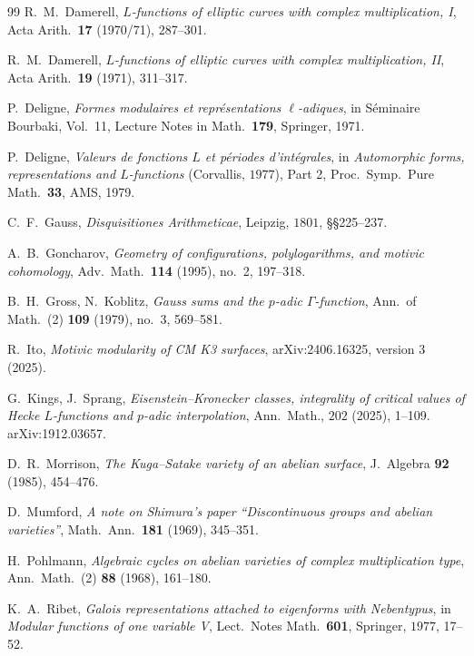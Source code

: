 \documentclass[11pt,a4paper]{amsart}
\theoremstyle{plain}
\theoremstyle{definition}
\begin{document}
\begin{thebibliography}{99}
R.\ M.\ Damerell,
\emph{$L$-functions of elliptic curves with complex multiplication, I},
Acta Arith.\ \textbf{17} (1970/71), 287--301.

R.\ M.\ Damerell,
\emph{$L$-functions of elliptic curves with complex multiplication, II},
Acta Arith.\ \textbf{19} (1971), 311--317.

P.\ Deligne,
\emph{Formes modulaires et repr\'esentations $\ell$-adiques}, in
S\'eminaire Bourbaki, Vol.\ 11, Lecture Notes in Math.\ \textbf{179},
Springer, 1971.

P.\ Deligne,
\emph{Valeurs de fonctions $L$ et p\'eriodes d'int\'egrales}, in
\emph{Automorphic forms, representations and $L$-functions} (Corvallis,
$1977$), Part 2, Proc.\ Symp.\ Pure Math.\ \textbf{33}, AMS, 1979.

C.\ F.\ Gauss,
\emph{Disquisitiones Arithmeticae}, Leipzig, $1801$, \S\S225--237.

A.\ B.\ Goncharov,
\emph{Geometry of configurations, polylogarithms, and motivic cohomology},
Adv.\ Math.\ \textbf{114} (1995), no.\ 2, 197--318.

B.\ H.\ Gross, N.\ Koblitz,
\emph{Gauss sums and the $p$-adic $\Gamma$-function},
Ann.\ of Math.\ (2) \textbf{109} (1979), no.\ 3, 569--581.

R.\ Ito,
\emph{Motivic modularity of CM K3 surfaces}, arXiv:2406.16325, version 3
(2025).

G.\ Kings, J.\ Sprang,
\emph{Eisenstein--Kronecker classes, integrality of critical values of
Hecke $L$-functions and $p$-adic interpolation},
Ann.\ Math., $202$ (2025), 1--109. arXiv:1912.03657.

D.\ R.\ Morrison,
\emph{The Kuga--Satake variety of an abelian surface},
J.\ Algebra \textbf{92} (1985), 454--476.

D.\ Mumford,
\emph{A note on Shimura's paper ``Discontinuous groups and abelian
varieties''}, Math.\ Ann.\ \textbf{181} (1969), 345--351.

H.\ Pohlmann,
\emph{Algebraic cycles on abelian varieties of complex multiplication
type}, Ann.\ Math.\ (2) \textbf{88} (1968), 161--180.

K.\ A.\ Ribet,
\emph{Galois representations attached to eigenforms with Nebentypus},
in \emph{Modular functions of one variable V}, Lect.\ Notes Math.\ \textbf{601},
Springer, $1977$, 17--52.


\end{thebibliography}
\end{document}
